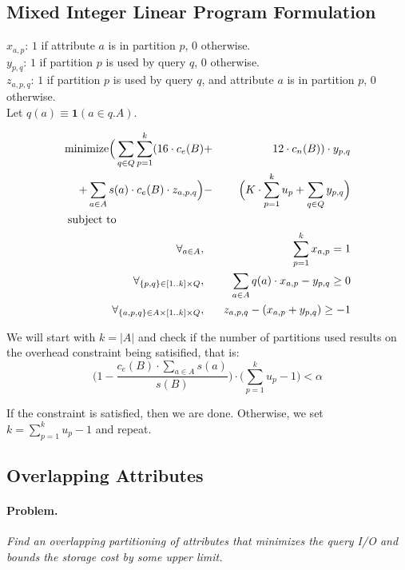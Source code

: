 \documentclass[twocolumn]{svjour3}          %
\begin{document}
\subsection{Mixed Integer Linear Program Formulation}
$x_{a,p}$: $1$ if attribute $a$ is in partition $p$, $0$ otherwise.\\
$y_{p,q}$: $1$ if partition $p$ is used by query $q$, $0$ otherwise.\\
$z_{a,p,q}$: $1$ if partition $p$ is used by query $q$, and attribute $a$ is in partition $p$, $0$ otherwise.\\

Let $q(a)\equiv \mathbf{1}(a \in q.A)$.

\begin{eqnarray}
\text{minimize} 
    \Big(\sum_{q\in Q} \sum_{p=1}^{k} (16\cdot c_e(B) &+& 12\cdot c_n(B))\cdot y_{p,q}\nonumber\\
    + \sum_{a\in A} s(a)\cdot c_e(B)\cdot z_{a,p,q}\Big) &-& \Big(K\cdot \sum_{p=1}^{k} u_p + \sum_{q\in Q} y_{p,q}\Big) \nonumber\\
\text{subject to}\hspace{2.75cm}&&\nonumber\\
\forall_{a\in A}, 
    && \sum_{p=1}^{k} x_{a,p} = 1\nonumber\\
\forall_{\{p,q\}\in [1..k]\times Q}, 
    &&  \sum_{a\in A} q(a)\cdot x_{a,p} - y_{p,q} \geq 0 \nonumber\\
\forall_{\{a,p,q\}\in A\times [1..k]\times Q},
  && z_{a,p,q} - (x_{a,p} + y_{p,q}) \geq -1\nonumber\\
\end{eqnarray}

We will start with $k=|A|$ and check if the number of partitions used results
on the overhead constraint being satisified, that is:
$$\Big(1-\frac{c_e(B)\cdot \sum_{a\in A} s(a)}{s(B)}\Big) \cdot \Big(\sum_{p=1}^{k} u_p -1\Big) < \alpha$$

If the constraint is satisfied, then we are done. Otherwise, we set
$k=\sum_{p=1}^{k} u_p -1$ and repeat.

\subsection{Overlapping Attributes}

\paragraph*{Problem.}\emph{Find an overlapping partitioning of attributes that minimizes
  the query I/O and bounds the storage cost by some upper limit.}
\end{document}

